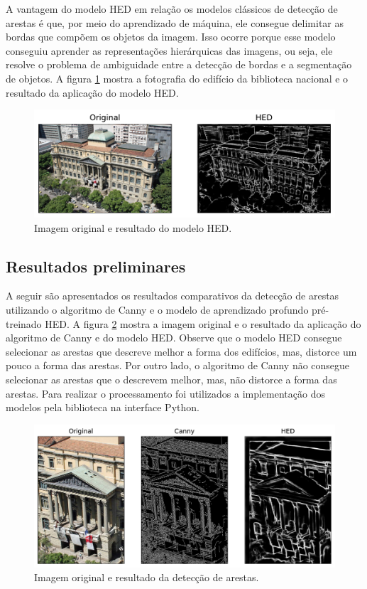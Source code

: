 \documentclass[12pt]{article}
\begin{document}
A vantagem do modelo HED em relação os modelos clássicos de detecção de arestas é que, por meio do aprendizado de máquina, ele consegue delimitar as bordas que compõem os objetos da imagem. Isso ocorre porque esse modelo conseguiu aprender as representações hierárquicas das imagens, ou seja, ele resolve o problema de ambiguidade entre a detecção de bordas e a segmentação de objetos. A figura \ref{fig:hed} mostra a fotografia do edifício da biblioteca nacional e o resultado da aplicação do modelo HED.

\begin{figure}[H]
\centering
\includegraphics[scale=0.75]{bib_hed.pdf}
\caption{Imagem original e resultado do modelo HED.}
\label{fig:hed}
\end{figure}


\subsection{Resultados preliminares}

A seguir são apresentados os resultados comparativos da detecção de arestas utilizando o algoritmo de Canny e o modelo de aprendizado profundo pré-treinado HED. A figura \ref{fig:arestas} mostra a imagem original e o resultado da aplicação do algoritmo de Canny e do modelo HED. Observe que o modelo HED consegue selecionar as arestas que descreve melhor a forma dos edifícios, mas, distorce um pouco a forma das arestas. Por outro lado, o algoritmo de Canny não consegue selecionar as arestas que o descrevem melhor, mas, não distorce a forma das arestas. Para realizar o processamento foi utilizados a implementação dos modelos pela biblioteca \cite[Opencv]{opencv_library} na interface Python.


\begin{figure}[H]
\centering
\includegraphics[scale=0.60]{bib_sub_filtro.pdf}
\caption{Imagem original e resultado da detecção de arestas.}
\label{fig:arestas}
\end{figure}
\end{document}
